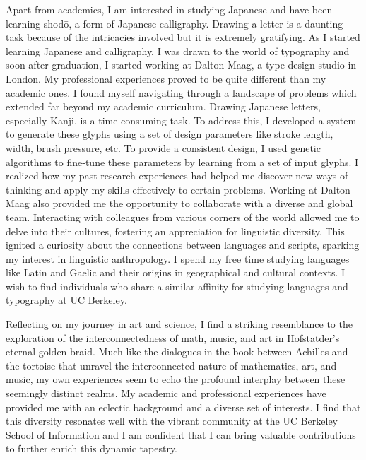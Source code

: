 \documentclass[11pt]{article}
\begin{document}
\hspace{0.25in}Apart from academics, I am interested in studying Japanese and
have been learning shodō, a form of Japanese calligraphy. Drawing a letter is a
daunting task because of the intricacies involved but it is extremely
gratifying. As I started learning Japanese and calligraphy, I was drawn to the
world of typography and soon after graduation, I started working at Dalton Maag,
a type design studio in London. My professional experiences proved to be quite
different than my academic ones. I found myself navigating through a landscape
of problems which extended far beyond my academic curriculum. Drawing Japanese
letters, especially Kanji, is a time-consuming task. To address this, I
developed a system to generate these glyphs using a set of design parameters
like stroke length, width, brush pressure, etc. To provide a consistent design,
I used genetic algorithms to fine-tune these parameters by learning from a set
of input glyphs. I realized how my past research experiences had helped me
discover new ways of thinking and apply my skills effectively to certain
problems. Working at Dalton Maag also provided me the opportunity to collaborate
with a diverse and global team. Interacting with colleagues from various corners
of the world allowed me to delve into their cultures, fostering an appreciation
for linguistic diversity. This ignited a curiosity about the connections between
languages and scripts, sparking my interest in linguistic anthropology. I spend
my free time studying languages like Latin and Gaelic and their origins in
geographical and cultural contexts. I wish to find individuals who share a
similar affinity for studying languages and typography at UC Berkeley. 

\hspace{0.25in}Reflecting on my journey in art and science, I find a striking
resemblance to the exploration of the interconnectedness of math, music, and
art in Hofstatder’s eternal golden braid. Much like the dialogues in the book
between Achilles and the tortoise that unravel the interconnected nature of
mathematics, art, and music, my own experiences seem to echo the profound
interplay between these seemingly distinct realms. My academic and professional
experiences have provided me with an eclectic background and a diverse set of
interests. I find that this diversity resonates well with the vibrant community
at the UC Berkeley School of Information and I am confident that I can bring
valuable contributions to further enrich this dynamic tapestry.
\end{document}
